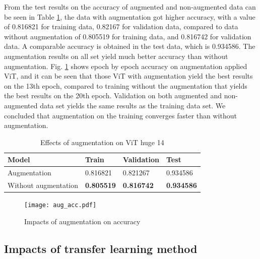 \documentclass{article}
\begin{document}
From the test results on the accuracy of augmented and non-augmented data can be seen in Table \ref{aug_acc_table}, the data with augmentation got higher accuracy, with a value of 0.816821 for training data, 0.82167 for validation data, compared to data without augmentation of 0.805519 for training data, and 0.816742 for validation data. A comparable accuracy is obtained in the test data, which is 0.934586. The augmentation results on all set yield much better accuracy than without augmentation. Fig. \ref{aug_acc_fig} shows epoch by epoch accuracy on augmentation applied ViT, and it can be seen that those ViT with augmentation yield the best results on the 13th epoch, compared to training without the augmentation that yields the best results on the 20th epoch. Validation on both augmented and non-augmented data set yields the same results as the training data set. We concluded that augmentation on the training converges faster than without augmentation.

\begin{table}[!b]
	\caption{Effects of augmentation on ViT huge 14}
	\label{aug_acc_table}
	\centering
	\begin{tabular}{p{4cm}|p{2cm}p{2cm}p{2cm}}
		Model & Train & Validation & Test \\
		\hline
		Augmentation &
		0.816821 &
		0.821267 &
		0.934586 \\
		Without augmentation &
		\textbf{0.805519} &
		\textbf{0.816742} &
		\textbf{0.934586} \\
	\end{tabular}
\end{table}

\begin{figure}[!b]
	\centering
	\texttt{[image: aug\_acc.pdf]}
	\caption{Impacts of augmentation on accuracy}
	\label{aug_acc_fig}
\end{figure}


\subsection{Impacts of transfer learning method}
\end{document}
